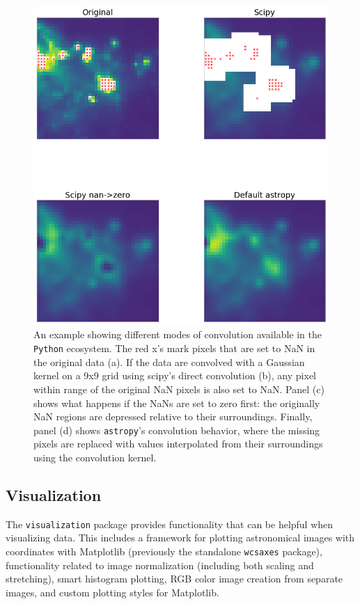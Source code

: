 \documentclass[modern]{aastex61}
\newcommand{\package}[1]{\texttt{#1}\xspace}
\newcommand{\python}{\package{Python}\xspace}
\newcommand{\astropypkg}{\package{astropy}\xspace}
\begin{document}
\begin{figure}
\includegraphics[width=\textwidth]{convolution_example.png}
\caption{%
    An example showing different modes of convolution available in the \python
    ecosystem.  The red x's mark pixels that are set to NaN in the original data
    (a).  If the data are convolved with a Gaussian kernel on a 9x9 grid using
    scipy's direct convolution (b), any pixel within range of the original NaN
    pixels is also set to NaN.  Panel (c) shows what happens if the NaNs are set
    to zero first: the originally NaN regions are depressed relative to their
    surroundings.  Finally, panel (d) shows \astropypkg's convolution behavior,
    where the missing pixels are replaced with values interpolated from their
    surroundings using the convolution kernel.
    \label{fig:convolution-example}
}
\end{figure}


\subsection{Visualization}

The \package{visualization} package provides functionality that can be helpful when visualizing data. This includes a framework for plotting astronomical images with coordinates with Matplotlib (previously the standalone \package{wcsaxes} package), functionality related to image normalization (including both scaling and stretching), smart histogram plotting, RGB color image creation from separate images, and custom plotting styles for Matplotlib.
\end{document}
